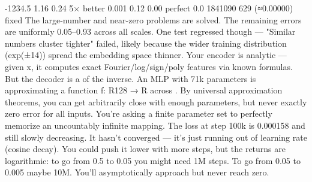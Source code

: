 {}\markdownRendererPipe{} -1234.5 \markdownRendererPipe{} 1.16\markdownRendererPercentSign{} \markdownRendererPipe{} 0.24\markdownRendererPercentSign{} \markdownRendererPipe{} 5× better \markdownRendererPipe{}\markdownRendererSoftLineBreak
{}\markdownRendererPipe{} 0.001 \markdownRendererPipe{} 0.12\markdownRendererPercentSign{} \markdownRendererPipe{} 0.00\markdownRendererPercentSign{} \markdownRendererPipe{} perfect \markdownRendererPipe{}\markdownRendererSoftLineBreak
{}\markdownRendererPipe{} 0.0 \markdownRendererPipe{} 1841090\markdownRendererPercentSign{} \markdownRendererPipe{} 629\markdownRendererPercentSign{} (≈0.00000) \markdownRendererPipe{} fixed \markdownRendererPipe{}\markdownRendererParagraphSeparator
{}The large-number and near-zero problems are solved. The remaining errors are uniformly 0.05–0.93\markdownRendererPercentSign{} across all scales. One test regressed though — "Similar numbers cluster tighter" failed, likely because the wider training distribution (exp(±14)) spread the embedding space thinner.\markdownRendererInterblockSeparator
{}\markdownRendererThematicBreak{}\markdownRendererInterblockSeparator
{}
\markdownRendererSectionEnd \markdownRendererSectionBegin
{}\markdownRendererInterblockSeparator
{}\markdownRendererInterblockSeparator
{}\markdownRendererSectionBegin
{}\markdownRendererInterblockSeparator
{}Your encoder is analytic — given x, it computes exact Fourier/log/sign/poly features via known formulas. But the decoder is a  of the inverse. An MLP with 71k parameters is approximating a function f: R\markdownRendererCircumflex{}128 → R across . By universal approximation theorems, you can get arbitrarily close with enough parameters, but never exactly zero error for all inputs. You're asking a finite parameter set to perfectly memorize an uncountably infinite mapping.\markdownRendererInterblockSeparator
{}
\markdownRendererSectionEnd \markdownRendererSectionBegin
{}\markdownRendererInterblockSeparator
{}The loss at step 100k is \markdownRendererTilde{}0.000158 and still slowly decreasing. It hasn't converged — it's just running out of learning rate (cosine decay). You could push it lower with more steps, but the returns are logarithmic: to go from 0.5\markdownRendererPercentSign{} to 0.05\markdownRendererPercentSign{} you might need 1M steps. To go from 0.05\markdownRendererPercentSign{} to 0.005\markdownRendererPercentSign{} maybe 10M. You'll asymptotically approach but never reach zero.\markdownRendererInterblockSeparator
